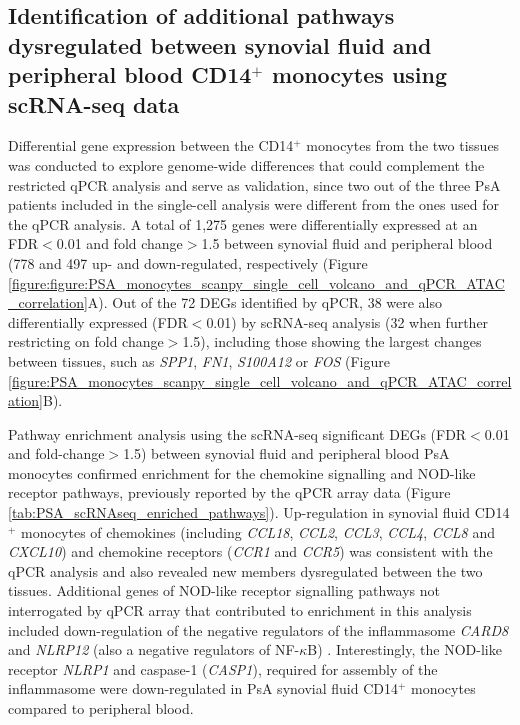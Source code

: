 \subsection{Identification of additional pathways dysregulated between  synovial fluid and peripheral blood CD14$^+$ monocytes using scRNA-seq data }
Differential gene expression between the CD14$^+$ monocytes from the two tissues was conducted to explore genome-wide differences that could complement the restricted qPCR analysis and serve as validation, since two out of the three PsA patients included in the single-cell analysis were different from the ones used for the qPCR analysis. A total of 1,275 genes were differentially expressed at an FDR$<$0.01 and fold change$>$1.5 between synovial fluid and peripheral blood (778 and 497 up- and down-regulated, respectively (Figure \ref{figure:figure:PSA_monocytes_scanpy_single_cell_volcano_and_qPCR_ATAC_correlation}A). Out of the 72 DEGs identified by qPCR, 38 were also differentially expressed (FDR$<$0.01) by scRNA-seq analysis (32 when further restricting on fold change$>$1.5), including those showing  the largest changes between tissues, such as \textit{SPP1}, \textit{FN1}, \textit{S100A12} or \textit{FOS} (Figure \ref{figure:PSA_monocytes_scanpy_single_cell_volcano_and_qPCR_ATAC_correlation}B). 


Pathway enrichment analysis using the scRNA-seq significant DEGs (FDR$<$0.01 and fold-change$>$1.5) between synovial fluid and peripheral blood PsA monocytes confirmed enrichment for the chemokine signalling and NOD-like receptor pathways, previously reported by the qPCR array data (Figure \ref{tab:PSA_scRNAseq_enriched_pathways}). Up-regulation in synovial fluid CD14$^+$ monocytes of chemokines (including \textit{CCL18}, \textit{CCL2}, \textit{CCL3}, \textit{CCL4}, \textit{CCL8} and \textit{CXCL10}) and chemokine receptors (\textit{CCR1} and \textit{CCR5}) was consistent with the qPCR analysis and also revealed new members dysregulated between the two tissues. Additional genes of NOD-like receptor signalling pathways not interrogated by qPCR array that contributed to enrichment in this analysis included down-regulation of the negative regulators of the inflammasome \textit{CARD8} and \textit{NLRP12} (also a negative regulators of NF-$\kappa$B) \parencite{Mao2018,Williams2005}. Interestingly, the NOD-like receptor \textit{NLRP1} and caspase-1 (\textit{CASP1}), required for assembly of the inflammasome were down-regulated in PsA synovial fluid CD14$^+$ monocytes compared to peripheral blood.

